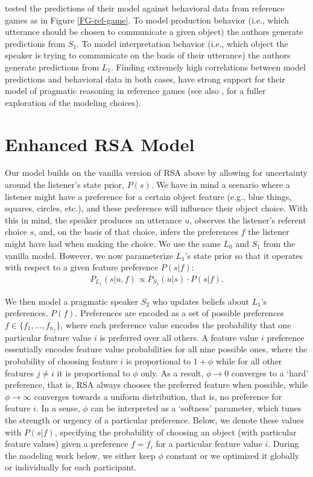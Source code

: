 \documentclass[10pt,a4paper]{article}
\begin{document}
 tested the predictions of their model against behavioral data from reference games as in Figure \ref{FG-ref-game}. To model production behavior (i.e., which utterance should be chosen to communicate a given object) the authors generate predictions from $S_1$. To model interpretation behavior (i.e., which object the speaker is trying to communicate on the basis of their utterance) the authors generate predictions from $L_1$. Finding extremely high correlations between model predictions and behavioral data in both cases, \citeauthor{frankgoodman2012} have strong support for their model of pragmatic reasoning in reference games (see also , for a fuller exploration of the modeling choices).


\section{Enhanced RSA Model}
Our model builds on the vanilla version of RSA above by allowing for uncertainty around the listener's state prior, $P(s)$. We have in mind a scenario where a listener might have a preference for a certain object feature (e.g., blue things, squares, circles, etc.), and these preference will influence their object choice.
With this in mind, the speaker produces an utterance $u$, observes the listener's referent choice $s$, and, on the basis of that choice, infers the preferences $f$ the listener might have had when making the choice.
We use the same $L_0$ and $S_1$ from the vanilla model. However, we now parameterize $L_1$'s state prior so that it operates with respect to a given feature preference $P(s|f)$:
\begin{gather}
P_{L_{1}}(s|u,f) \propto P_{S_{1}}(u|s) \cdot P(s|f).
\end{gather}

We then model a pragmatic speaker $S_2$ who updates beliefs about $L_1$'s preferences, $P(f)$.
Preferences are encoded as a set of possible preferences $f\in\{f_1,\dots,f_{n_f}\}$, where each 
preference value encodes the probability that one particular feature value $i$ is preferred over all others.
A feature value $i$ preference essentially encodes feature value probabilities for all nine possible ones, 
where the probability of choosing feature $i$ is proportional to $1+\phi$ while for all other features $j\neq i$ it is proportional to $\phi$ only. 
As a result, $\phi \rightarrow 0$ converges to a `hard' preference, that is, RSA always chooses the preferred feature when possible, while $\phi \rightarrow \infty$ converges towards a uniform distribution, that is, no preference for feature $i$. 
In a sense, $\phi$ can be interpreted as a `softness' parameter, which tunes the strength or urgency of a particular preference. 
Below, we denote these values with $P(s|f)$, specifying the probability of choosing an object (with particular feature values) given a preference $f=f_i$ for a particular feature value $i$.
During the modeling work below, we either keep $\phi$ constant or we optimized it globally or individually for each participant. 
\end{document}
